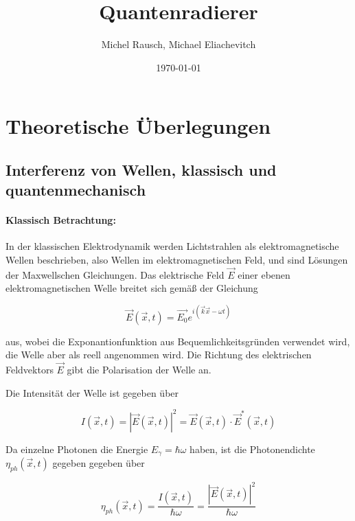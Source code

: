 \documentclass[a4paper,ngerman]{scrartcl}
\title{Quantenradierer}
\date{\today}
\author{Michel Rausch, Michael Eliachevitch}
\begin{document}
\maketitle
\tableofcontents
\thispagestyle{empty} %
\newpage
\setcounter{page}{1}

\section{Theoretische Überlegungen}
\label{sec:theorie}

\subsection{Interferenz von Wellen, klassisch und quantenmechanisch}
\label{sec:interferenz}

\paragraph{Klassisch Betrachtung:}
\label{par:klass}
In der klassischen Elektrodynamik werden Lichtstrahlen als elektromagnetische Wellen beschrieben, also Wellen im elektromagnetischen Feld,
und sind Lösungen der Maxwellschen Gleichungen. Das elektrische Feld $\vec{E}$ einer ebenen elektromagnetischen Welle breitet sich gemäß der
Gleichung

\begin{equation}
\vec{E}(\vec{x},t) = \vec{E_0} e^{i(\vec{k}\vec{x}-\omega t)}
\end{equation}

aus, wobei die Exponantionfunktion aus Bequemlichkeitsgründen verwendet wird, die Welle aber
als reell angenommen wird. Die Richtung des elektrischen Feldvektors $\vec{E}$ gibt die Polarisation der Welle an.

Die Intensität der Welle ist gegeben über 

\begin{equation}
I(\vec{x},t) = |\vec{E}(\vec{x},t)|^2 = \vec{E}(\vec{x},t) \cdot \vec{E}^*(\vec{x},t)
\end{equation}

Da einzelne Photonen die Energie $E_\gamma = \hbar \omega$ haben, ist die Photonendichte $\eta_{ph}(\vec{x},t)$ gegeben gegeben über

\begin{equation}
  \eta_{ph}(\vec{x},t) = \frac{I(\vec{x},t)}{\hbar \omega} = \frac{|\vec{E}(\vec{x},t)|^2}{\hbar \omega}
\end{equation}
\end{document}
